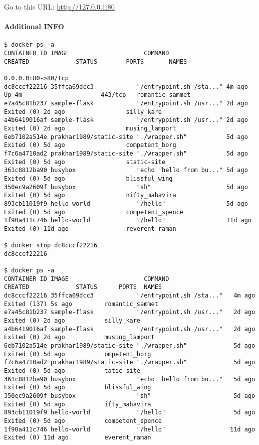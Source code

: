 

Go to this URL: \url{http://127.0.0.1:80}

\paragraph{Additional INFO}


\begin{lstlisting}[basicstyle=\tiny\ttfamily]
$ docker ps -a
CONTAINER ID IMAGE                     COMMAND                  CREATED             STATUS        PORTS       NAMES
                                                                                           0.0.0.0:80->80/tcp   
dc8cccf22216 35ffca69dcc3            "/entrypoint.sh /sta..." 4m ago Up 4m                      443/tcp   romantic_sammet
e7a45c81b237 sample-flask            "/entrypoint.sh /usr..." 2d ago    Exited (0) 2d ago                 silly_kare
a4b6419016af sample-flask            "/entrypoint.sh /usr..." 2d ago    Exited (0) 2d ago                 musing_lamport
6eb7102a514e prakhar1989/static-site "./wrapper.sh"           5d ago    Exited (0) 5d ago                 competent_borg
f7c6a4710ad2 prakhar1989/static-site "./wrapper.sh"           5d ago    Exited (0) 5d ago                 static-site
361c8812ba90 busybox                 "echo 'hello from bu..." 5d ago    Exited (0) 5d ago                 blissful_wing
350ec9a2609f busybox                 "sh"                     5d ago    Exited (0) 5d ago                 nifty_mahavira
893cb11019f9 hello-world             "/hello"                 5d ago    Exited (0) 5d ago                 competent_spence
1f90a411c746 hello-world             "/hello"                 11d ago   Exited (0) 11d ago                reverent_raman

$ docker stop dc8cccf22216
dc8cccf22216

$ docker ps -a
CONTAINER ID IMAGE                     COMMAND                  CREATED             STATUS      PORTS  NAMES
dc8cccf22216 35ffca69dcc3            "/entrypoint.sh /sta..."   4m ago     Exited (137) 5s ago         romantic_sammet
e7a45c81b237 sample-flask            "/entrypoint.sh /usr..."   2d ago     Exited (0) 2d ago           silly_kare
a4b6419016af sample-flask            "/entrypoint.sh /usr..."   2d ago     Exited (0) 2d ago           musing_lamport
6eb7102a514e prakhar1989/static-site "./wrapper.sh"             5d ago     Exited (0) 5d ago           ompetent_borg
f7c6a4710ad2 prakhar1989/static-site "./wrapper.sh"             5d ago     Exited (0) 5d ago           tatic-site
361c8812ba90 busybox                 "echo 'hello from bu..."   5d ago     Exited (0) 5d ago           blissful_wing
350ec9a2609f busybox                 "sh"                       5d ago     Exited (0) 5d ago           ifty_mahavira
893cb11019f9 hello-world             "/hello"                   5d ago     Exited (0) 5d ago           competent_spence
1f90a411c746 hello-world             "/hello"                  11d ago     Exited (0) 11d ago          everent_raman
\end{lstlisting}


